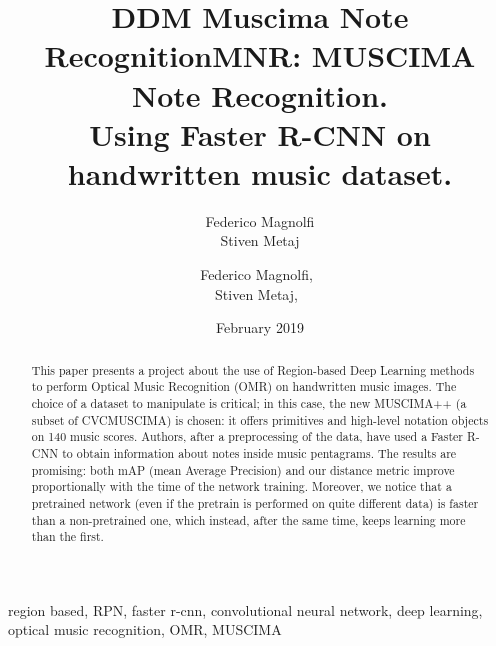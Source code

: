 \documentclass[journal]{IEEEtran}
\title{DDM Muscima Note Recognition}
\author{Federico Magnolfi\\Stiven Metaj}
\date{February 2019}
\begin{document}
	\title{MNR: MUSCIMA Note Recognition.\\ Using Faster R-CNN on handwritten music dataset.}
	\author{Federico Magnolfi,~\\
		Stiven Metaj,~%
	}  
	
	\markboth{}{}
	
	
	\maketitle
	
	
	
	\begin{abstract}
		This paper presents a project about the use of Region-based Deep Learning methods to perform Optical Music Recognition (OMR) on handwritten music images. The choice of a dataset to manipulate is critical; in this case, the new MUSCIMA++ (a subset of CVCMUSCIMA) is chosen: it offers primitives and high-level notation objects on 140 music scores. Authors, after a preprocessing of the data, have used a Faster R-CNN to obtain information about notes inside music pentagrams. The results are promising: both mAP (mean Average Precision) and our distance metric improve proportionally with the time of the network training. Moreover, we notice that a pretrained network (even if the pretrain is performed on quite different data) is faster than a non-pretrained one, which instead, after the same time, keeps learning more than the first.
	\end{abstract}
	
	
	\begin{IEEEkeywords}
		region based, RPN, faster r-cnn, convolutional neural network, deep learning, optical music recognition, OMR, MUSCIMA
	\end{IEEEkeywords}
	
	
\end{document}
